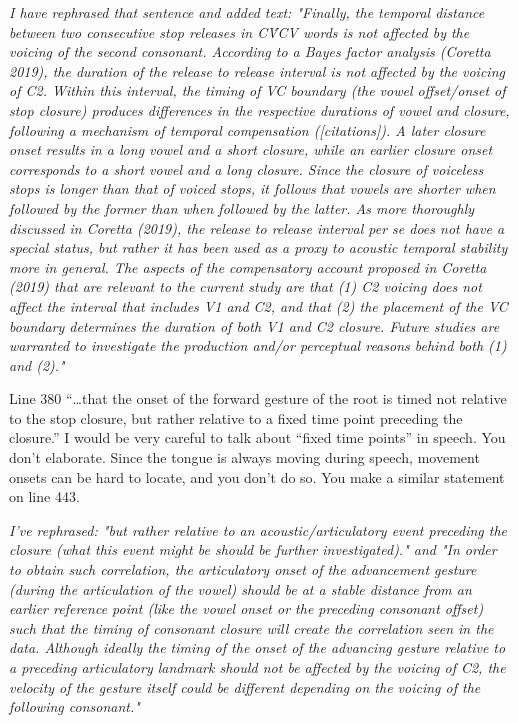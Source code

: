 \documentclass[]{article}
\begin{document}
\begin{adjustwidth}{1cm}{} \textit{
I have rephrased that sentence and added text:
"Finally, the temporal distance between two consecutive stop releases in CV́CV words is not affected by the voicing of the second consonant.
According to a Bayes factor analysis (Coretta 2019), the duration of the release to release interval is not affected by the voicing of C2.
Within this interval, the timing of VC boundary (the vowel offset/onset of stop closure) produces differences in the respective durations of vowel and closure, following a mechanism of temporal compensation ([citations]).
A later closure onset results in a long vowel and a short closure, while an earlier closure onset corresponds to a short vowel and a long closure.
Since the closure of voiceless stops is longer than that of voiced stops, it follows that vowels are shorter when followed by the former than when followed by the latter.
As more thoroughly discussed in Coretta (2019), the release to release interval per se does not have a special status, but rather it has been used as a proxy to acoustic temporal stability more in general.
The aspects of the compensatory account proposed in Coretta (2019) that are relevant to the current study are that (1) C2 voicing does not affect the interval that includes V1 and C2, and that (2) the placement of the VC boundary determines the duration of both V1 and C2 closure.
Future studies are warranted to investigate the production and/or perceptual reasons behind both (1) and (2)."
} \end{adjustwidth}

Line 380 ``\ldots{}that the onset of the forward gesture of the root is
timed not relative to the stop closure, but rather relative to a fixed
time point preceding the closure.'' I would be very careful to talk
about ``fixed time points'' in speech. You don't elaborate. Since the
tongue is always moving during speech, movement onsets can be hard to
locate, and you don't do so. You make a similar statement on line 443.

\begin{adjustwidth}{1cm}{} \textit{
I've rephrased: "but rather relative to an acoustic/articulatory event preceding the closure (what this event might be should be further investigated)." and "In order to obtain such correlation, the articulatory onset of the advancement gesture (during the articulation of the vowel) should be at a stable distance from an earlier reference point (like the vowel onset or the preceding consonant offset) such that the timing of consonant closure will create the correlation seen in the data.
Although ideally the timing of the onset of the advancing gesture relative to a preceding articulatory landmark should not be affected by the voicing of C2, the velocity of the gesture itself could be different depending on the voicing of the following consonant."
} \end{adjustwidth}
\end{document}
